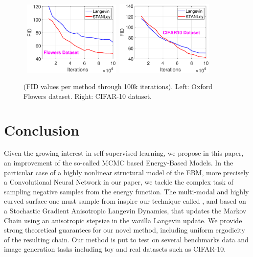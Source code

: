 \documentclass[10pt,twocolumn,letterpaper]{article}
\begin{document}
\begin{figure}[H]
\begin{center}
\mbox{\hspace{-0.2in}
        \includegraphics[width=1.9in]{figs/fid_flowers.eps} \hspace{-0.2in}
        \includegraphics[width=1.9in]{figs/fid_cifar.eps}
}
\end{center}
	\caption{(FID values per method through 100k iterations). Left: Oxford Flowers dataset. Right: CIFAR-10 dataset.}
	\label{fig:cifarfid}
\end{figure}



\section{Conclusion}\label{sec:conclusion}

Given the growing interest in self-supervised learning, we propose in this paper, an improvement of the so-called MCMC based Energy-Based Models.
In the particular case of a highly nonlinear structural model of the EBM, more precisely a Convolutional Neural Network in our paper, we tackle the complex task of sampling negative samples from the energy function.
The multi-modal and highly curved surface one must sample from inspire our technique called \algo, and based on a Stochastic Gradient Anisotropic Langevin Dynamics, that updates the Markov Chain using an anisotropic stepsize in the vanilla Langevin update.
We provide strong theoretical guarantees for our novel method, including uniform ergodicity of the resulting chain.
Our method is put to test on several benchmarks data and image generation tasks including toy and real datasets such as CIFAR-10.
\end{document}
